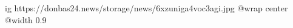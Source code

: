  
 
 
 
 

\ifcmt
  ig https://donbas24.news/storage/news/6xzuniga4voc3agi.jpg
  @wrap center
  @width 0.9
\fi
